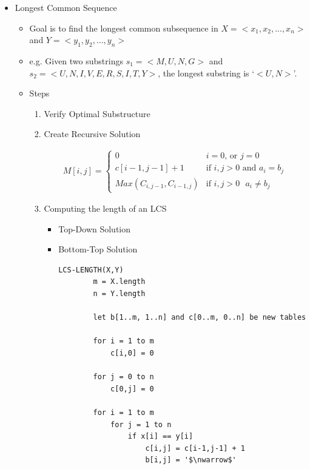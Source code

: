 \documentclass[12pt]{article}
\begin{document}
\begin{enumerate}[1.]
    \begin{itemize}
        \item Longest Common Sequence
        \begin{itemize}
            \item Goal is to find the longest common subsequence in $X = <x_1, x_2, ..., x_n>$ and $Y = <y_1, y_2, ... , y_n>$
            \item e.g. Given two substrings $s_1 = <M,U,N,G>$ and $s_2 = <U,N,I,V,E,R,S,I,T,Y>$, the longest
            substring is `$<U,N>$'.
            \item Steps
            \begin{enumerate}[1.]
                \item Verify Optimal Substructure
                \item Create Recursive Solution

                \bigskip

                \begin{align}
                    M[i,j] = \begin{cases}
                        0 & \text{$i = 0$, or $j = 0$}\\
                        c[i-1,j-1]+1 & \text{if $i,j > 0$ and $a_i = b_j$}\\
                        Max(C_{i,j-1},C_{i-1,j}) & \text{if $i,j > 0$ $a_i \neq b_j$}
                    \end{cases}
                \end{align}

                \item Computing the length of an LCS

                \bigskip

                \begin{itemize}
                    \item Top-Down Solution
                    \item Bottom-Top Solution

    \begin{lstlisting}[mathescape=true]
    LCS-LENGTH(X,Y)
        m = X.length
        n = Y.length

        let b[1..m, 1..n] and c[0..m, 0..n] be new tables

        for i = 1 to m
            c[i,0] = 0

        for j = 0 to n
            c[0,j] = 0

        for i = 1 to m
            for j = 1 to n
                if x[i] == y[i]
                    c[i,j] = c[i-1,j-1] + 1
                    b[i,j] = '$\nwarrow$'


\end{lstlisting}
\end{itemize}
\end{enumerate}
\end{itemize}
\end{itemize}
\end{enumerate}
\end{document}
